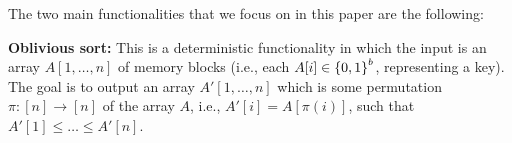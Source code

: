 %
%

The two main functionalities that we focus on in this paper are the following:

\smallskip
\noindent
{\bf Oblivious sort:} This is a deterministic functionality in which the input is an array $A[1,\ldots,n]$ of memory blocks (i.e., each $A[i] \in {\{0,1\}}^{b}$, representing a key). The goal is to output an array $A'[1,\ldots,n]$ which is some permutation $\pi:[n] \rightarrow [n]$ of the array $A$, i.e., $A'[i] = A[\pi(i)]$, such that $A'[1]\leq \ldots \leq A'[n]$. %

